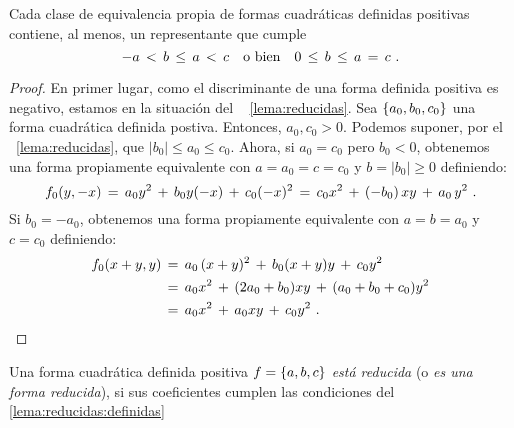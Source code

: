 % 

\begin{lemaReducidas}\label{lema:reducidas:definidas}
	Cada clase de equivalencia propia de formas cuadr\'aticas
	definidas positivas contiene, al menos, un representante que
	cumple
	\begin{displaymath}
		-a\,<\,b\,\leq\,a\,<\,c\quad\text{o bien}\quad
		0\,\leq\,b\,\leq\,a\,=\,c
		\text{ .}
	\end{displaymath}
\end{lemaReducidas}

\begin{proof}
	En primer lugar, como el discriminante de una forma definida
	positiva es negativo, estamos en la situaci\'on del \lemaname~%
	\ref{lema:reducidas}. Sea $\left\{a_0,b_0,c_0\right\}$ una forma
	cuadr\'atica definida postiva. Entonces, $a_0,c_0>0$.
	Podemos suponer, por el \lemaname~\ref{lema:reducidas}, que
	$|b_0|\leq a_0\leq c_0$. Ahora, si $a_0=c_0$ pero $b_0<0$,
	obtenemos una forma propiamente equivalente con $a=a_0=c=c_0$ y
	$b=|b_0|\geq 0$ definiendo:
	\begin{displaymath}
		f_0(y,-x)\,=\,a_0y^2\,+\,b_0y(-x)\,+\,c_0(-x)^2\,=\,
			c_0x^2\,+\,(-b_0)\,xy\,+\,a_0\,y^2
		\text{ .}
	\end{displaymath}
	Si $b_0=-a_0$, obtenemos una forma propiamente equivalente con
	$a=b=a_0$ y $c=c_0$ definiendo:
	\begin{displaymath}
		\begin{aligned}
			f_0(x+y,y) & \,=\,
				a_0\,(x+y)^2\,+\,b_0(x+y)y\,+\,c_0y^2 \\
			& \,=\,a_0x^2\,+\,(2a_0+b_0)xy\,+\,(a_0+b_0+c_0)y^2 \\
			& \,=\,a_0x^2\,+\,a_0xy\,+\,c_0y^2
			\text{ .}
		\end{aligned}
	\end{displaymath}
\end{proof}

\begin{defReducidas}\label{def:reducidas}
	Una forma cuadr\'atica definida positiva $f=\left\{a,b,c\right\}$
	\emph{est\'a reducida} (o \emph{es una forma reducida}), si
	sus coeficientes cumplen las condiciones del \lemaname~%
	\ref{lema:reducidas:definidas}
\end{defReducidas}

